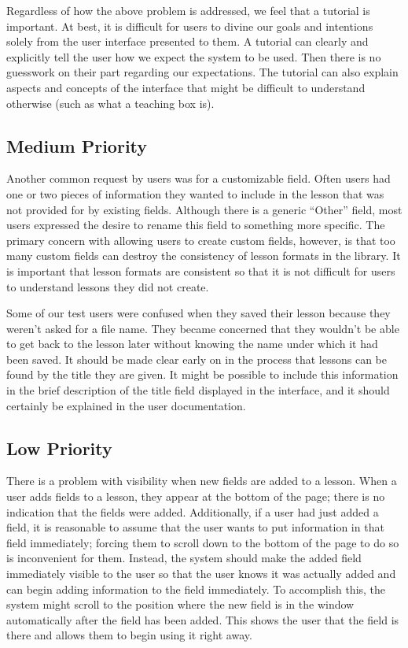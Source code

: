 \documentclass[10pt,letter]{article}
\begin{document}
Regardless of how the above problem is addressed, we feel that a tutorial is
important. At best, it is difficult for users to divine our goals and intentions
solely from the user interface presented to them. A tutorial can clearly and
explicitly tell the user how we expect the system to be used. Then there is no
guesswork on their part regarding our expectations. The tutorial can also
explain aspects and concepts of the interface that might be difficult to
understand otherwise (such as what a teaching box is).

\subsection{Medium Priority}
Another common request by users was for a customizable field. Often users had
one or two pieces of information they wanted to include in the lesson that was
not provided for by existing fields. Although there is a generic ``Other''
field, most users expressed the desire to rename this field to something more
specific. The primary concern with allowing users to create custom fields,
however, is that too many custom fields can destroy the consistency of lesson
formats in the library. It is important that lesson formats are consistent so
that it is not difficult for users to understand lessons they did not create.

Some of our test users were confused when they saved their lesson because they
weren't asked for a file name. They became concerned that they wouldn't be able
to get back to the lesson later without knowing the name under which it had been
saved. It should be made clear early on in the process that lessons can be found
by the title they are given. It might be possible to include this information in
the brief description of the title field displayed in the interface, and it
should certainly be explained in the user documentation.

\subsection{Low Priority}
There is a problem with visibility when new fields are added to a lesson. When
a user adds fields to a lesson, they appear at the bottom of the page; there is
no indication that the fields were added. Additionally, if a user had just added
a field, it is reasonable to assume that the user wants to put information in
that field immediately; forcing them to scroll down to the bottom of the page to
do so is inconvenient for them. Instead, the system should make the added field
immediately visible to the user so that the user knows it was actually added and
can begin adding information to the field immediately. To accomplish this, the
system might scroll to the position where the new field is in the window
automatically after the field has been added. This shows the user that the field
is there and allows them to begin using it right away.
\end{document}
